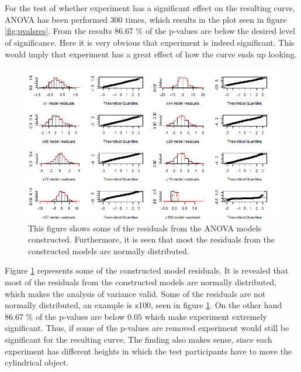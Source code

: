 \documentclass[11pt, fleqn, titlepage]{article}
\begin{document}
\\\\
For the test of whether experiment has a significant effect on the resulting curve, ANOVA has been performed 300 times, which results in the plot seen in figure \ref{fig:pvalsres}. From the results 86.67 \% of the p-values are below the desired level of significance. Here it is very obvious that experiment is indeed significant. This would imply that experiment has a great effect of how the curve ends up looking.
\begin{figure}[H]
	\centering
	\includegraphics[width=0.7\linewidth]{billeder/StadigNormalfordeltAF.png}
	\caption{This figure shows some of the residuals from the ANOVA models constructed. Furthermore, it is seen that most the residuals from the constructed models are normally distributed. }
	\label{fig:stadignormalfordeltaf}
\end{figure} \noindent \vspace*{-0.1cm}
 Figure \ref{fig:stadignormalfordeltaf} represents some of the constructed model residuals. It is revealed that most of the residuals from the constructed models are normally distributed, which makes the analysis of variance valid. Some of the residuals are not normally distributed, an example is z100, seen in figure \ref{fig:stadignormalfordeltaf}. On the other hand $ 86.67 $ \% of the p-values are below $ 0.05 $ which make experiment extremely significant. Thus, if some of the p-values are removed  experiment would still be significant for the resulting curve. The finding also makes sense, since each experiment has different heights in which the test participants have to move the cylindrical object. 
\end{document}
